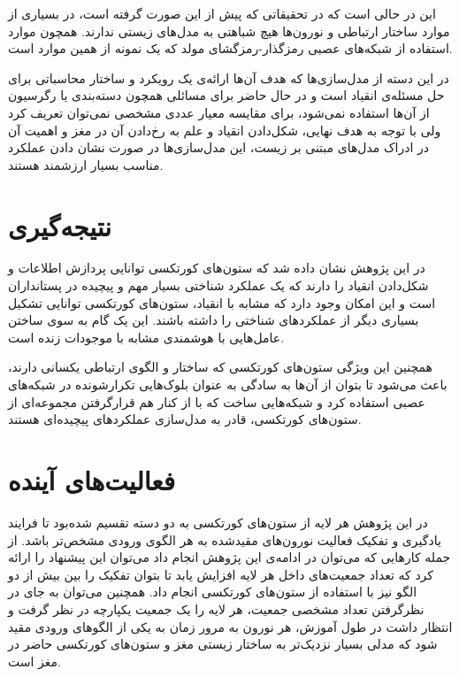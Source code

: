 \documentclass[12pt]{report}
\begin{document}
	این در حالی است که در تحقیقاتی که پیش از این صورت گرفته است، در بسیاری از موارد ساختار ارتباطی و نورون‌ها هیچ شباهتی به مدل‌های زیستی ندارند. همچون موارد استفاده از شبکه‌های عصبی رمزگذار-رمزگشای مولد که یک نمونه از همین موارد است.
	
	در این دسته از مدل‌سازی‌ها که هدف آن‌ها ارائه‌ی یک رویکرد و ساختار محاسباتی برای حل مسئله‌ی انقیاد است و در حال حاضر برای مسائلی همچون دسته‌بندی یا رگرسیون از آن‌ها استفاده نمی‌شود، برای مقایسه معیار عددی مشخصی نمی‌توان تعریف کرد ولی با توجه به هدف نهایی، شکل‌دادن انقیاد و علم به رخ‌دادن آن در مغز و اهمیت آن در ادراک مدل‌های مبتنی بر زیست، این مدل‌سازی‌ها در صورت نشان دادن عملکرد مناسب بسیار ارزشمند هستند.
	
	\section{نتیجه‌گیری}
	در این پژوهش نشان داده شد که ستون‌های کورتکسی توانایی پردازش اطلاعات و  شکل‌دادن انقیاد را دارند که یک عملکرد شناختی بسیار مهم و پیچیده در پستانداران است و این امکان وجود دارد که مشابه با انقیاد، ستون‌های کورتکسی توانایی تشکیل بسیاری دیگر از عملکرد‌های شناختی را داشته باشند. این یک گام به سوی ساختن عامل‌هایی با هوشمندی مشابه با موجودات زنده است.
	
	همچنین این ویژگی ستون‌های کورتکسی که ساختار و الگوی ارتباطی یکسانی دارند، باعث می‌شود تا بتوان از آن‌ها به سادگی به عنوان بلوک‌هایی تکرار‌شونده در شبکه‌های عصبی استفاده کرد و شبکه‌هایی ساخت که با از کنار هم قرارگرفتن مجموعه‌ای از ستون‌های کورتکسی، قادر به مدل‌سازی عملکرد‌های پیچیده‌ای هستند.
	
	\section{فعالیت‌های آینده}
	در این پژوهش هر لایه از ستون‌های کورتکسی به دو دسته تقسیم شده‌بود تا فرایند یادگیری و تفکیک فعالیت نورون‌های مقید‌شده به هر الگوی ورودی مشخص‌تر باشد. از جمله کار‌هایی که می‌توان در ادامه‌ی این پژوهش انجام داد می‌توان این پیشنهاد را ارائه کرد  که تعداد جمعیت‌‌های داخل هر لایه افزایش یابد تا بتوان تفکیک را بین بیش از دو الگو نیز با استفاده از ستون‌های کورتکسی انجام داد. همچنین می‌توان به جای در نظرگرفتن تعداد مشخصی جمعیت، هر لایه را یک جمعیت یکپارچه در نظر گرفت و انتظار داشت در طول آموزش، هر نورون به مرور زمان به یکی از الگو‌های ورودی مقید شود که  مدلی بسیار نزدیک‌تر به ساختار زیستی مغز و ستون‌های کورتکسی حاضر در مغز است.

	
	
	
	
\end{document}
